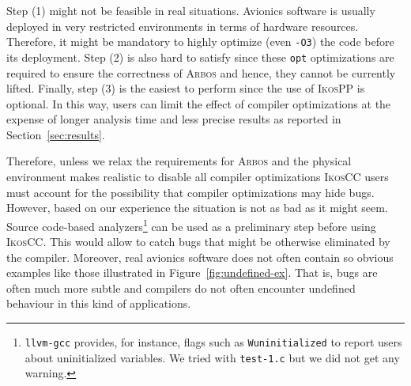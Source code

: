 \documentclass[a4]{article}
\newcommand{\arbos}{\textsc{Arbos}\xspace}
\newcommand{\ikoscc}{\textsc{IkosCC}\xspace}
\newcommand{\ikospp}{\textsc{IkosPP}\xspace}
\newcommand{\llvmgcc}{\texttt{llvm-gcc}\xspace}
\newcommand{\llvmopt}{\texttt{opt}\xspace}
\begin{document}
Step (1) might not be feasible in real situations. Avionics software
is usually deployed in very restricted environments in terms of
hardware resources. Therefore, it might be mandatory to highly
optimize (even \texttt{-O3}) the code before its deployment. Step (2)
is also hard to satisfy since these \llvmopt optimizations are
required to ensure the correctness of \arbos and hence, they cannot be
currently lifted. Finally, step (3) is the easiest to perform since
the use of \ikospp is optional. In this way, users can limit the
effect of compiler optimizations at the expense of longer analysis
time and less precise results as reported in
Section~\ref{sec:results}.
%

Therefore, unless we relax the requirements for \arbos and the
physical environment makes realistic to disable all compiler
optimizations \ikoscc users must account for the possibility that
compiler optimizations may hide bugs. However, based on our experience
the situation is not as bad as it might seem. Source code-based
analyzers\footnote{\llvmgcc provides, for instance, flags such as
  \texttt{Wuninitialized} to report users about uninitialized
  variables. We tried with \texttt{test-1.c} but we did not get any
  warning.}  can be used as a preliminary step before using
\ikoscc. This would allow to catch bugs that might be otherwise
eliminated by the compiler. Moreover, real avionics software does not
often contain so obvious examples like those illustrated in
Figure~\ref{fig:undefined-ex}. That is, bugs are often much more
subtle and compilers do not often encounter undefined behaviour in
this kind of applications.
\end{document}
